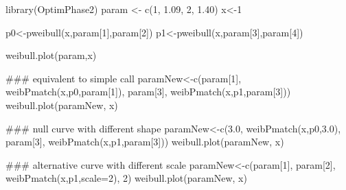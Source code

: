 \begin{Examples}
\begin{ExampleCode}

library(OptimPhase2)
param <- c(1, 1.09, 2, 1.40)
x<-1

p0<-pweibull(x,param[1],param[2])
p1<-pweibull(x,param[3],param[4])

weibull.plot(param,x)

### equivalent to simple call
paramNew<-c(param[1], weibPmatch(x,p0,param[1]), param[3], weibPmatch(x,p1,param[3]))
weibull.plot(paramNew, x)

### null curve with different shape
paramNew<-c(3.0, weibPmatch(x,p0,3.0), param[3], weibPmatch(x,p1,param[3]))
weibull.plot(paramNew, x)

### alternative curve with different scale
paramNew<-c(param[1], param[2], weibPmatch(x,p1,scale=2), 2)
weibull.plot(paramNew, x)

\end{ExampleCode}
\end{Examples}

